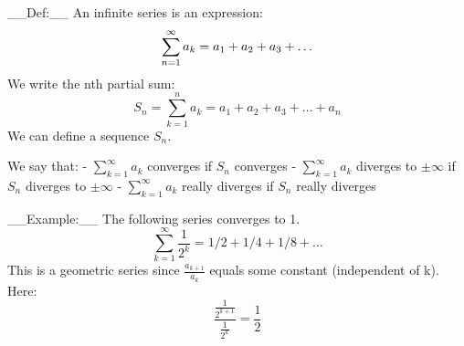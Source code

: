 __Def:__ An infinite series is an expression: $$\\\sum_{n=1}^{\infty}{a_{k}}=a_{1}+a_{2}+a_{3}+\dots $$
We write the nth partial sum: $$S_n = \sum_{k=1}^n a_{k}=a_{1}+a_{2}+a_{3}+\dots+a_{n}$$
We can define a sequence {$S_n$}.

We say that:
- $\sum_{k=1}^\infty a_{k}$ converges if {${S_n}$} converges
- $\sum_{k=1}^\infty a_{k}$ diverges to $\pm \infty$ if {$S_n$} diverges to $\pm \infty$
- $\sum_{k=1}^\infty a_{k}$ really diverges if {$S_{n}$} really diverges

__Example:__
The following series converges to 1.
$$ \sum_{k=1}^\infty \frac{1}{2^k}= 1/2 + 1/4 + 1/8 + \dots$$
This is a geometric series since $\frac{a_{k+1}}{a_{k}}$ equals some constant (independent of k). Here:
$$\frac{\frac{1}{2^{k+1}}}{\frac{1}{2^k}}=\frac{1}{2}$$
